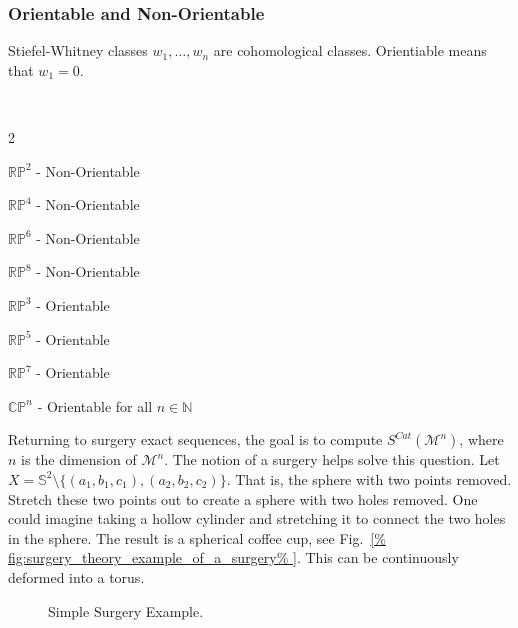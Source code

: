         \subsubsection{Orientable and Non-Orientable}
            Stiefel-Whitney classes $w_{1},\hdots, w_{n}$ are
            cohomological classes.
            Orientiable means that $w_{1}=0$.
            \begin{example}
                \
                \begin{enumerate}
                \end{enumerate}
            \end{example}
            Returning to surgery exact sequences, the goal
            is to compute $S^{Cat}(\mathcal{M}^{n})$, where $n$
            is the dimension of $\mathcal{M}^{n}$. The notion
            of a surgery helps solve this question. Let
            $X=\mathbb{S}^{2}\setminus%
             \{(a_{1},b_{1},c_{1}),(a_{2},b_{2},c_{2})\}$.
            That is, the sphere with two points removed.
            Stretch these two points out to create a sphere
            with two holes removed. One could imagine taking
            a hollow cylinder and stretching it to connect
            the two holes in the sphere. The result is a
            spherical coffee cup, see
            Fig.~\ref{%
                fig:surgery_theory_example_of_a_surgery%
            }.
            This can be continuously deformed into a torus.
            \begin{figure}[H]
                \centering
                \captionsetup{type=figure}
                \resizebox{\textwidth}{!}
                    {}
                \caption{Simple Surgery Example.}
                \label{fig:surgery_theory_example_of_a_surgery}
            \end{figure}
